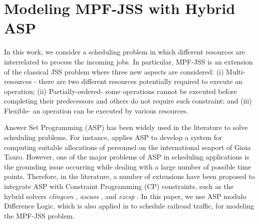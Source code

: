 \documentclass[submission,copyright,creativecommons]{eptcs}
\newcommand{\jss}{MPF-JSS\xspace}
\begin{document}
\section{Modeling MPF-JSS with Hybrid ASP}\label{sec:aspmodeling}
In this work, we consider a scheduling problem in which different resources are interrelated to process the incoming jobs. In particular, MPF-JSS is an extension of the classical JSS problem where three new aspects are considered: (i) Multi-resources - there are two different resources potentially required to execute an operation; (ii) Partially-ordered- some operations cannot be executed before completing their predecessors and others do not require such constraint; and (iii) Flexible- an operation can be executed by various resources. 

Answer Set Programming (ASP) has been widely used in the literature to solve scheduling problems. For instance, \cite{DBLP:journals/corr/abs-1101-4554} applies ASP to develop a system for computing suitable allocations of personnel on the international seaport of Gioia Tauro. However, one of the major problems of ASP in scheduling applications is the grounding issue occurring while dealing with a large number of possible time points. 
Therefore, in the literature, a number of extensions have been proposed to integrate ASP with Constraint Programming (CP) constraints, such as the hybrid solvers \emph{clingcon} \cite{Banbara2017ClingconTN}, \emph{ascass} \cite{Teppan2018}, and \emph{ezcsp} \cite{BalducciniRepresentingCS,DBLP:conf/lpnmr/Balduccini11}. In this paper, we use ASP modulo Difference Logic, which is also applied in \cite{DBLP:conf/lpnmr/AbelsJOSTW19} to schedule railroad traffic, for modeling the \jss problem.
\end{document}

